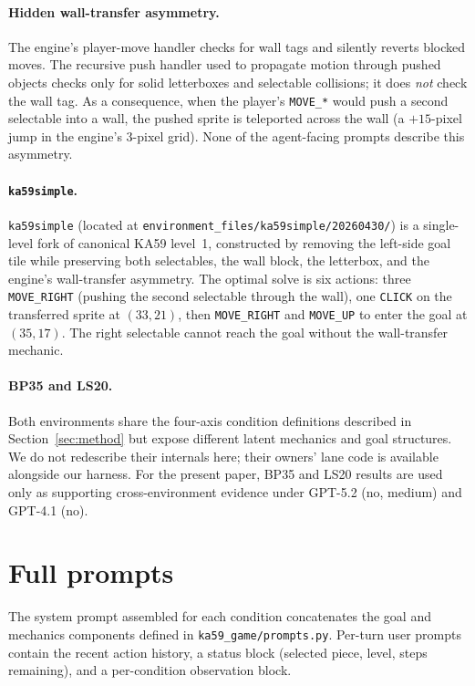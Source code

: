 \documentclass{article}
\begin{document}
\paragraph{Hidden wall-transfer asymmetry.}
The engine's player-move handler checks for wall tags and silently reverts blocked moves. The recursive push handler used to propagate motion through pushed objects checks only for solid letterboxes and selectable collisions; it does \emph{not} check the wall tag. As a consequence, when the player's \texttt{MOVE\_*} would push a second selectable into a wall, the pushed sprite is teleported across the wall (a $+15$-pixel jump in the engine's $3$-pixel grid). None of the agent-facing prompts describe this asymmetry.

\paragraph{\texttt{ka59simple}.}
\texttt{ka59simple} (located at \texttt{environment\_files/ka59simple/20260430/}) is a single-level fork of canonical KA59 level~1, constructed by removing the left-side goal tile while preserving both selectables, the wall block, the letterbox, and the engine's wall-transfer asymmetry. The optimal solve is six actions: three \texttt{MOVE\_RIGHT} (pushing the second selectable through the wall), one \texttt{CLICK} on the transferred sprite at $(33, 21)$, then \texttt{MOVE\_RIGHT} and \texttt{MOVE\_UP} to enter the goal at $(35, 17)$. The right selectable cannot reach the goal without the wall-transfer mechanic.

\paragraph{BP35 and LS20.}
Both environments share the four-axis condition definitions described in Section~\ref{sec:method} but expose different latent mechanics and goal structures. We do not redescribe their internals here; their owners' lane code is available alongside our harness. For the present paper, BP35 and LS20 results are used only as supporting cross-environment evidence under GPT-5.2 (no, medium) and GPT-4.1 (no).

\section{Full prompts}
\label{app:prompts}
The system prompt assembled for each condition concatenates the goal and mechanics components defined in \texttt{ka59\_game/prompts.py}. Per-turn user prompts contain the recent action history, a status block (selected piece, level, steps remaining), and a per-condition observation block.
\end{document}

